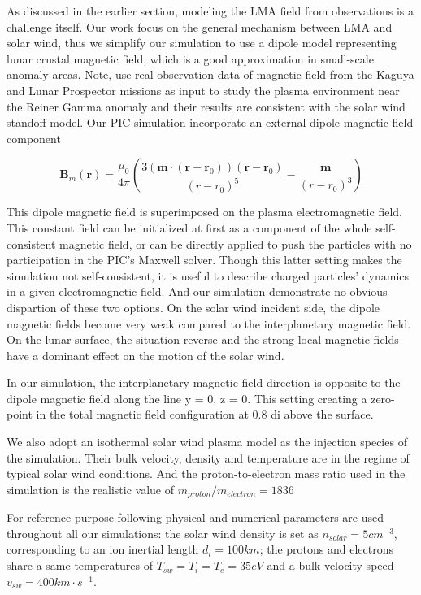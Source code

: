As discussed in the earlier section, modeling the LMA field from observations is a challenge itself. Our work focus on the general mechanism between LMA and solar wind, thus we simplify our simulation to use a dipole model representing lunar crustal magnetic field, which is a good approximation in small-scale anomaly areas. Note,  \cite{decaPlasmaEnvironmentSurrounding2021} use real observation data of magnetic field from the Kaguya and Lunar Prospector missions as input to study the plasma environment near the Reiner Gamma anomaly and their results are consistent with the solar wind standoff model. Our PIC simulation incorporate an external dipole magnetic field component

$$\boldsymbol{B}_{m}(\boldsymbol{r})=\frac{\mu_{0}}{4 \pi}\left(\frac{3\left(\boldsymbol{m} \cdot\left(\boldsymbol{r}-\boldsymbol{r}_{0}\right)\right)\left(\boldsymbol{r}-\boldsymbol{r}_{0}\right)}{\left(r-r_{0}\right)^{5}}-\frac{\boldsymbol{m}}{\left(r-r_{0}\right)^{3}}\right)$$

This dipole magnetic field is superimposed on the plasma electromagnetic field. This constant field can be initialized at first as a component of the whole self-consistent magnetic field, or can be directly applied to push the particles with no participation in the PIC's Maxwell solver. Though this latter setting makes the simulation not self-consistent, it is useful to describe charged particles' dynamics in a given electromagnetic field. And our simulation demonstrate no obvious dispartion of these two options. On the solar wind incident side, the dipole magnetic fields become very weak compared to the interplanetary magnetic field. On the lunar surface, the situation reverse and the strong local magnetic fields have a dominant effect on the motion of the solar wind.

In our simulation, the interplanetary magnetic field direction is opposite to the dipole magnetic field along the line y = 0, z = 0. This setting creating a zero-point in the total magnetic field configuration at 0.8 di above the surface.

We also adopt an isothermal solar wind plasma model as the injection species of the simulation. Their bulk velocity, density and temperature are in the regime of typical solar wind conditions. And the proton-to-electron mass ratio used in the simulation is the realistic value of $m_{proton}/m_{electron} = 1836$

For reference purpose following physical and numerical parameters are used throughout all our simulations: the solar wind density is set as $n_{solar} = 5 cm^{-3}$, corresponding to an ion inertial length $d_i = 100 km $; the protons and electrons share a same temperatures of $T_{sw} = T_i = T_e = 35 eV$ and a bulk velocity speed $v_{sw} =400km \cdot s^{-1}$.


